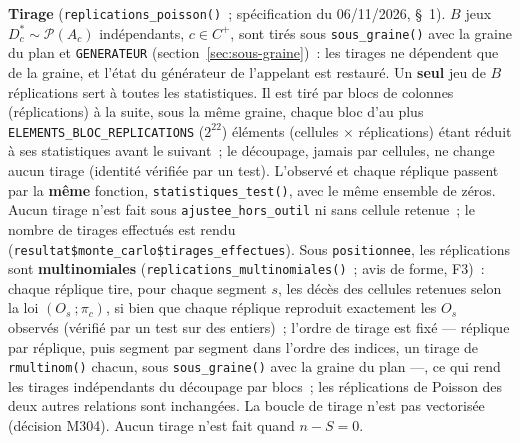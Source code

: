 \documentclass[a4paper,11pt]{article}
\newcommand{\code}[1]{\texttt{\small #1}}
\begin{document}
\textbf{Tirage} (\code{replications\_poisson()}~; spécification du
06/11/2026, §~1). $B$ jeux $D^{*}_c \sim \mathcal{P}(A_c)$ indépendants, $c \in
C^{+}$, sont tirés sous \code{sous\_graine()} avec la graine du plan et
\code{GENERATEUR} (section~\ref{sec:sous-graine})~: les tirages ne
dépendent que de la graine, et l'état du générateur de l'appelant est
restauré. Un \textbf{seul} jeu de $B$ réplications sert à toutes les
statistiques. Il est tiré par blocs de colonnes (réplications) à la suite,
sous la même graine, chaque bloc d'au plus
\code{ELEMENTS\_BLOC\_REPLICATIONS} ($2^{22}$) éléments (cellules
$\times$ réplications) étant réduit à ses statistiques avant le suivant~;
le découpage, jamais par cellules, ne change aucun tirage (identité vérifiée
par un test). L'observé et chaque réplique passent par la \textbf{même}
fonction, \code{statistiques\_test()}, avec le même ensemble de zéros.
Aucun tirage n'est fait sous \code{ajustee\_hors\_outil} ni sans cellule
retenue~; le nombre de tirages effectués est rendu
(\code{resultat\$monte\_carlo\$tirages\_effectues}). Sous \code{positionnee},
les réplications sont \textbf{multinomiales}
(\code{replications\_multinomiales()}~; avis de forme, F3)~: chaque réplique
tire, pour chaque segment $s$, les décès des cellules retenues selon la loi
$(O_s~; \pi_c)$, si bien que chaque réplique reproduit exactement les $O_s$
observés (vérifié par un test sur des entiers)~; l'ordre de tirage est
fixé --- réplique par réplique, puis segment par segment dans l'ordre des
indices, un tirage de \code{rmultinom()} chacun, sous
\code{sous\_graine()} avec la graine du plan ---, ce qui rend les tirages
indépendants du découpage par blocs~; les réplications de Poisson des deux
autres relations sont inchangées. La boucle de tirage n'est pas vectorisée
(décision M304). Aucun tirage n'est fait quand $n - S = 0$.
\end{document}
